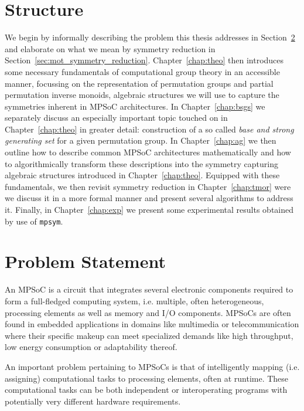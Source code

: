 \section{Structure}
\label{sec:mot_structure}

We begin by informally describing the problem this thesis addresses in
Section~\ref{sec:mot_problem_statement} and elaborate on what we mean by
symmetry reduction in Section~\ref{sec:mot_symmetry_reduction}.
%
Chapter~\ref{chap:theo} then introduces some necessary fundamentals of
computational group theory in an accessible manner, focussing on the
representation of permutation groups and partial permutation
inverse monoids, algebraic structures we will use to capture the symmetries
inherent in MPSoC architectures.
%
In Chapter~\ref{chap:bsgs} we separately discuss an especially important topic
touched on in Chapter~\ref{chap:theo} in greater detail: construction of a so
called \textit{base and strong generating set} for a given permutation group.
%
In Chapter~\ref{chap:ag} we then outline how to describe common MPSoC
architectures mathematically and how to algorithmically transform these
descriptions into the symmetry capturing algebraic structures introduced in
Chapter~\ref{chap:theo}.
%
Equipped with these fundamentals, we then revisit symmetry reduction in
Chapter~\ref{chap:tmor} were we discuss it in a more formal manner and present
several algorithms to address it.
%
Finally, in Chapter~\ref{chap:exp} we present some experimental results
obtained by use of \texttt{mpsym}.

\section{Problem Statement}
\label{sec:mot_problem_statement}

An MPSoC is a circuit that integrates several electronic components required to
form a full-fledged computing system, i.e. multiple, often heterogeneous,
processing elements as well as memory and I/O components. MPSoCs are often found in
embedded applications in domains like multimedia or telecommunication where
their specific makeup can meet specialized demands like high throughput, low
energy consumption or adaptability thereof.

An important problem pertaining to MPSoCs is that of intelligently mapping (i.e.
assigning) computational tasks to processing elements, often at runtime.  These
computational tasks can be both independent or interoperating programs with
potentially very different hardware requirements.

